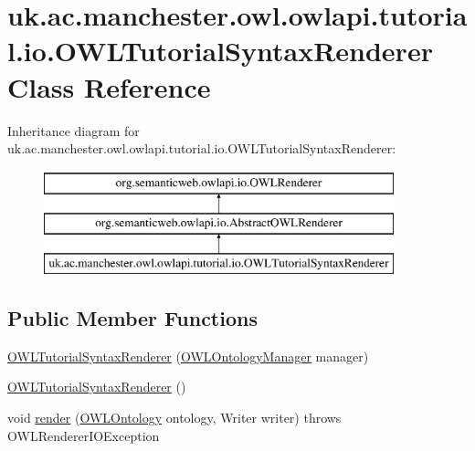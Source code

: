 \hypertarget{classuk_1_1ac_1_1manchester_1_1owl_1_1owlapi_1_1tutorial_1_1io_1_1_o_w_l_tutorial_syntax_renderer}{\section{uk.\-ac.\-manchester.\-owl.\-owlapi.\-tutorial.\-io.\-O\-W\-L\-Tutorial\-Syntax\-Renderer Class Reference}
\label{classuk_1_1ac_1_1manchester_1_1owl_1_1owlapi_1_1tutorial_1_1io_1_1_o_w_l_tutorial_syntax_renderer}
}
Inheritance diagram for uk.\-ac.\-manchester.\-owl.\-owlapi.\-tutorial.\-io.\-O\-W\-L\-Tutorial\-Syntax\-Renderer\-:\begin{figure}[H]
\begin{center}
\leavevmode
\includegraphics[height=3.000000cm]{classuk_1_1ac_1_1manchester_1_1owl_1_1owlapi_1_1tutorial_1_1io_1_1_o_w_l_tutorial_syntax_renderer}
\end{center}
\end{figure}
\subsection*{Public Member Functions}
\begin{DoxyCompactItemize}
\item 
\hyperlink{classuk_1_1ac_1_1manchester_1_1owl_1_1owlapi_1_1tutorial_1_1io_1_1_o_w_l_tutorial_syntax_renderer_a6f9932a69154fcbd816cdfa880c46912}{O\-W\-L\-Tutorial\-Syntax\-Renderer} (\hyperlink{interfaceorg_1_1semanticweb_1_1owlapi_1_1model_1_1_o_w_l_ontology_manager}{O\-W\-L\-Ontology\-Manager} manager)
\item 
\hyperlink{classuk_1_1ac_1_1manchester_1_1owl_1_1owlapi_1_1tutorial_1_1io_1_1_o_w_l_tutorial_syntax_renderer_ab36cd745f096e6774798a21388cf9d7f}{O\-W\-L\-Tutorial\-Syntax\-Renderer} ()
\item 
void \hyperlink{classuk_1_1ac_1_1manchester_1_1owl_1_1owlapi_1_1tutorial_1_1io_1_1_o_w_l_tutorial_syntax_renderer_a9dbe7ba8e833d398a99bdfc628a26b93}{render} (\hyperlink{interfaceorg_1_1semanticweb_1_1owlapi_1_1model_1_1_o_w_l_ontology}{O\-W\-L\-Ontology} ontology, Writer writer)  throws O\-W\-L\-Renderer\-I\-O\-Exception 
\end{DoxyCompactItemize}
